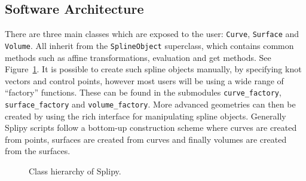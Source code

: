 \documentclass[preprint,12pt, a4paper]{elsarticle}
\begin{document}
\subsection{Software Architecture}
\label{sec:architecture}

There are three main classes which are exposed to the user: \texttt{Curve}, \texttt{Surface} and \texttt{Volume}.
All inherit from the \texttt{SplineObject} superclass, which contains common methods such as affine transformations, evaluation and get methods.
See Figure~\ref{fig:hierarchy}.
It is possible to create such spline objects manually, by specifying knot vectors and control points, however most users will be using a wide range of ``factory'' functions.
These can be found in the submodules \texttt{curve\_factory}, \texttt{surface\_factory} and \texttt{volume\_factory}.
More advanced geometries can then be created by using the rich interface for manipulating spline objects.
Generally Splipy scripts follow a bottom-up construction scheme where curves are created from points, surfaces are created from curves and finally volumes are created from the surfaces.

\begin{figure}
  \begin{center}
  \end{center}
  \caption{Class hierarchy of Splipy.}
  \label{fig:hierarchy}
\end{figure}
\end{document}

